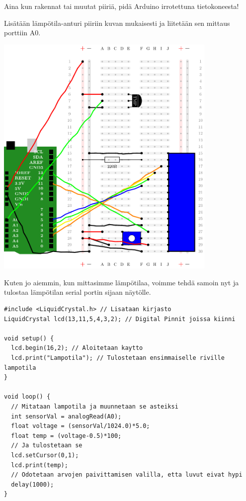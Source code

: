 \begin{tcolorbox}[colback=red!10,colbacktitle=red,title=HUOM!]
Aina kun rakennat tai muutat piiriä, pidä Arduino irrotettuna tietokoneesta! 
\end{tcolorbox}

Lisätään lämpötila-anturi piiriin kuvan mukaisesti ja liitetään sen mittaus porttiin A0. 


\includegraphics[width=0.8\textwidth]{kuvat/kuva24.pdf}

Kuten jo aiemmin, kun mittasimme lämpötilaa, voimme tehdä samoin nyt ja tulostaa lämpötilan serial portin sijaan näytölle.

\begin{lstlisting}[numbers=none]
#include <LiquidCrystal.h> // Lisataan kirjasto 
LiquidCrystal lcd(13,11,5,4,3,2); // Digital Pinnit joissa kiinni

void setup() {
  lcd.begin(16,2); // Aloitetaan kaytto
  lcd.print("Lampotila"); // Tulostetaan ensimmaiselle riville lampotila
}

void loop() {
  // Mitataan lampotila ja muunnetaan se asteiksi
  int sensorVal = analogRead(A0);
  float voltage = (sensorVal/1024.0)*5.0;
  float temp = (voltage-0.5)*100;
  // Ja tulostetaan se
  lcd.setCursor(0,1);
  lcd.print(temp);
  // Odotetaan arvojen paivittamisen valilla, etta luvut eivat hypi
  delay(1000);  
}
\end{lstlisting}
\clearpage
